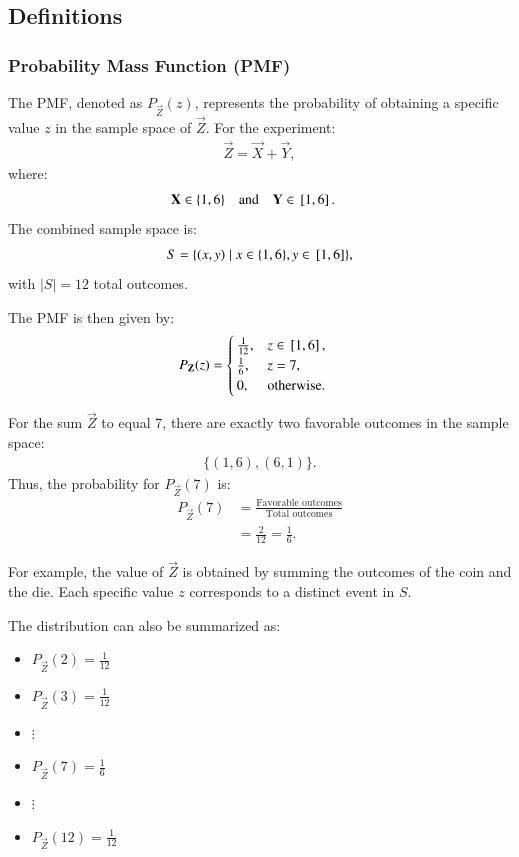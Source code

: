 \documentclass[journal]{IEEEtran}
\begin{document}
\subsection*{Definitions}
\subsubsection*{Probability Mass Function (PMF)}
The PMF, denoted as $P_{\vec{Z}}(z)$, represents the probability of obtaining a specific value $z$ in the sample space of $\vec{Z}$. For the experiment:
\begin{align}
\vec{Z} = \vec{X} + \vec{Y},
\end{align}
where:
\begin{align}
\mathbf{X} &\in \{1, 6\} \quad \text{and} \quad \mathbf{Y} \in {}\left[1,6\right].
\end{align}
The combined sample space is:
\begin{align}
S = \{(x, y) \mid x \in \{1, 6\}, y \in {}\left[1,6\right]\},
\end{align}
with $|S| = 12$ total outcomes.

The PMF is then given by:
\begin{align}
    P_{\mathbf{Z}}(z) &=
    \begin{cases}
        \frac{1}{12}, & z \in {}\left[1,6\right], \\
        \frac{1}{6}, & z = 7, \\
        0, & \text{otherwise}.
    \end{cases}
\end{align}

For the sum $\vec{Z}$ to equal 7, there are exactly two favorable outcomes in the sample space:
\begin{align}
\{(1, 6), (6, 1)\}.
\end{align}
Thus, the probability for $P_{\vec{Z}}(7)$ is:
\begin{align}
P_{\vec{Z}}(7) &= \frac{\text{Favorable outcomes}}{\text{Total outcomes}} \\
     &= \frac{2}{12} = \frac{1}{6}.
\end{align}

For example, the value of $\vec{Z}$ is obtained by summing the outcomes of the coin and the die. Each specific value $z$ corresponds to a distinct event in $S$. 

The distribution can also be summarized as:
\begin{itemize}
    \item $P_{\vec{Z}}(2) = \frac{1}{12}$
    \item $P_{\vec{Z}}(3) = \frac{1}{12}$
    \item $\vdots$
    \item $P_{\vec{Z}}(7) = \frac{1}{6}$
    \item $\vdots$
    \item $P_{\vec{Z}}(12) = \frac{1}{12}$
\end{itemize}
\end{document}
